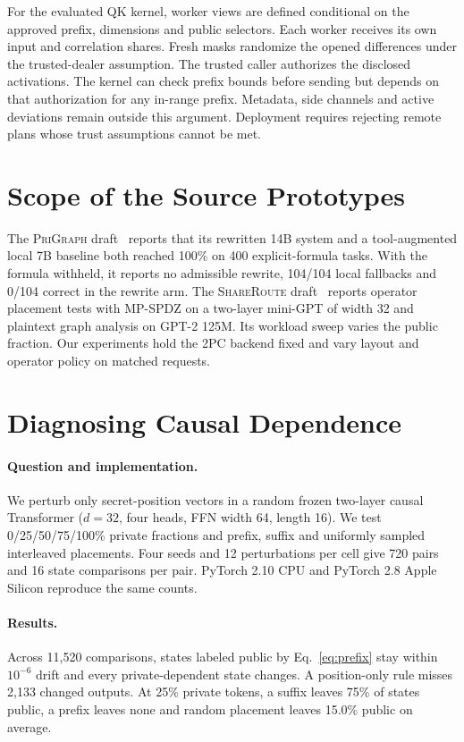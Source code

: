 \documentclass[runningheads]{llncs}
\newcommand{\srcA}{\textsc{PriGraph}}
\newcommand{\srcB}{\textsc{ShareRoute}}
\begin{document}
For the evaluated QK kernel, worker views are defined conditional on the
approved prefix, dimensions and public selectors. Each worker receives its
own input and correlation shares. Fresh masks randomize the opened
differences under the trusted-dealer assumption. The trusted caller
authorizes the disclosed activations. The kernel can check prefix bounds
before sending but depends on that authorization for any in-range prefix.
Metadata, side channels and active deviations remain outside this
argument. Deployment requires rejecting remote plans whose trust
assumptions cannot be met.

\section{Scope of the Source Prototypes}
\label{sec:eval}
The \srcA{} draft~\cite{prigraph-source} reports that its rewritten 14B
system and a tool-augmented local 7B baseline both reached 100\% on
400 explicit-formula tasks. With the formula withheld, it reports no
admissible rewrite, 104/104 local fallbacks and 0/104 correct in the
rewrite arm. The \srcB{} draft~\cite{shareroute-source} reports operator
placement tests with MP-SPDZ on a two-layer mini-GPT of width 32 and
plaintext graph analysis on GPT-2 125M. Its workload sweep varies the
public fraction. Our experiments hold the 2PC backend fixed and vary
layout and operator policy on matched requests.

\section{Diagnosing Causal Dependence}\label{sec:cpu}
\paragraph{Question and implementation.}
We perturb only secret-position vectors in a random frozen two-layer
causal Transformer ($d=32$, four heads, FFN width 64, length 16). We test
0/25/50/75/100\% private fractions and prefix, suffix and uniformly
sampled interleaved placements. Four seeds and 12 perturbations per cell
give 720 pairs and 16 state comparisons per pair. PyTorch 2.10 CPU and
PyTorch 2.8 Apple Silicon reproduce the same counts.

\paragraph{Results.}
Across 11,520 comparisons, states labeled public by Eq.~\eqref{eq:prefix}
stay within $10^{-6}$ drift and every private-dependent state changes.
A position-only rule misses 2,133 changed outputs. At 25\% private
tokens, a suffix leaves 75\% of states public, a prefix leaves none
and random placement leaves 15.0\% public on average.
\end{document}
